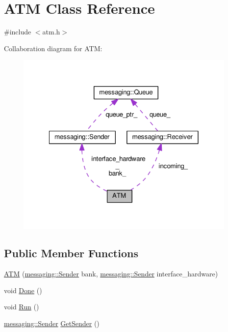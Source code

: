\hypertarget{classATM}{\section{A\-T\-M Class Reference}
\label{classATM}
}


{\ttfamily \#include $<$atm.\-h$>$}



Collaboration diagram for A\-T\-M\-:
\nopagebreak
\begin{figure}[H]
\begin{center}
\leavevmode
\includegraphics[width=307pt]{classATM__coll__graph}
\end{center}
\end{figure}
\subsection*{Public Member Functions}
\begin{DoxyCompactItemize}
\item 
\hyperlink{classATM_a8e0ede939f35c0a2818fdeda39ff586b}{A\-T\-M} (\hyperlink{classmessaging_1_1Sender}{messaging\-::\-Sender} bank, \hyperlink{classmessaging_1_1Sender}{messaging\-::\-Sender} interface\-\_\-hardware)
\item 
void \hyperlink{classATM_add4ca9f2b7c6ab6e0cb81cbcb925069e}{Done} ()
\item 
void \hyperlink{classATM_a03fb6655e150b1381a8aa595e4403d06}{Run} ()
\item 
\hyperlink{classmessaging_1_1Sender}{messaging\-::\-Sender} \hyperlink{classATM_a2aa23e220496bdd41d651151a1cc97e6}{Get\-Sender} ()
\end{DoxyCompactItemize}
